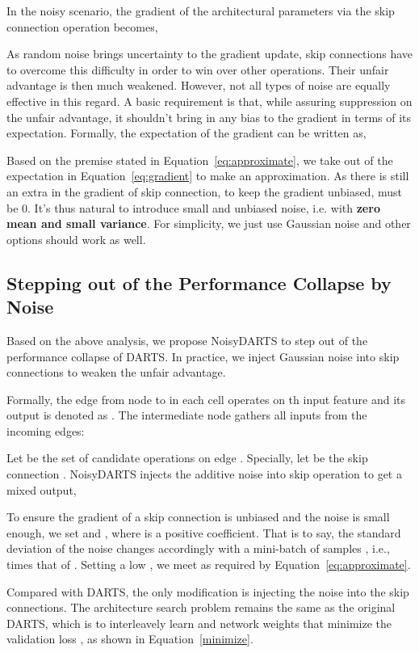 \documentclass{article}
\begin{document}
In the noisy scenario, the gradient of the architectural parameters via the skip connection operation becomes,



As random noise  brings uncertainty to the gradient update, skip connections have to overcome this difficulty in order to win over other operations. Their unfair advantage is then much weakened. However, not all types of noise are equally effective in this regard. A basic requirement is that, while assuring  suppression on the unfair advantage, it shouldn't bring in any bias to the gradient in terms of its expectation. 
Formally,  the expectation of the gradient can be written as,

Based on the premise stated in Equation~\ref{eq:approximate}, we take  out of the expectation in Equation~\ref{eq:gradient} to make an approximation. As there is still an extra  in the gradient of skip connection, to keep the gradient unbiased,  must be 0. It's thus natural to introduce small and unbiased noise, i.e. with \textbf{zero mean and small variance}. For simplicity, we just use Gaussian noise and other options should work as well.




\subsection{Stepping out of the Performance Collapse by Noise}
Based on the above analysis, we propose NoisyDARTS to step out of the performance collapse of DARTS. In practice, we inject Gaussian noise  into skip connections to weaken the unfair advantage. 

Formally, the edge  from node  to  in each cell operates on th input feature  and its output is denoted as . The intermediate node  gathers all inputs from the incoming edges:

Let  be the set of  candidate operations on edge . Specially, let  be the skip connection . NoisyDARTS injects the additive noise  into skip operation  to get a mixed output,


To ensure the gradient of a skip connection is unbiased and the noise  is small enough, we set  and , where  is a positive coefficient. That is to say, the standard deviation of the noise changes accordingly with a mini-batch of samples , i.e.,  times that of . Setting a low , we meet  as required by Equation~\ref{eq:approximate}. 

Compared with DARTS, the only modification is  injecting the noise into the skip connections. The architecture search problem remains the same as the original DARTS, which is to interleavely learn  and network weights  that minimize the validation loss , as shown in Equation~\ref*{minimize}. 
\end{document}
